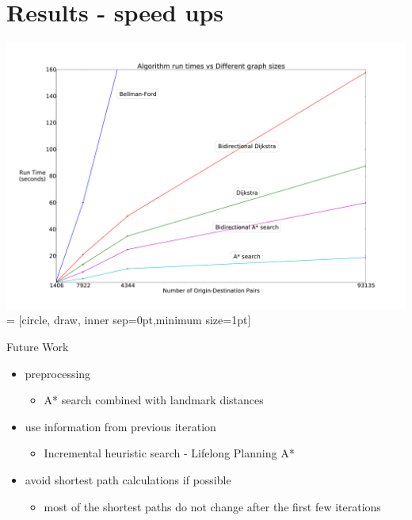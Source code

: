 \documentclass{beamer}
\begin{document}
\section{Results - speed ups}
\begin{frame}
    \includegraphics[width=\paperwidth, height=\paperheight, keepaspectratio, trim=0 0 0 60pt, clip]{img/runtime}
     = [circle, draw, inner sep=0pt,minimum size=1pt]
\end{frame}

\begin{frame}{Future Work}
    \begin{itemize}[<+->]
        \item preprocessing
            \begin{itemize}
                \item A* search combined with landmark distances
            \end{itemize}
        \item use information from previous iteration
            \begin{itemize}
                \item Incremental heuristic search - Lifelong Planning A*
            \end{itemize}
        \item avoid shortest path calculations if possible
            \begin{itemize}
                \item most of the shortest paths do not change after the first few iterations
            \end{itemize}
    \end{itemize}
\end{frame}
\end{document}
